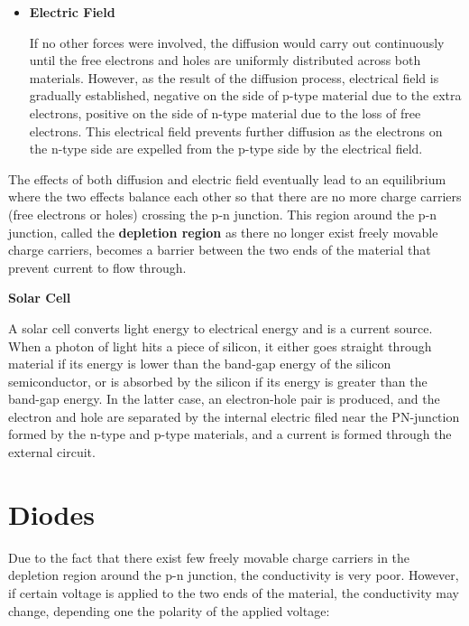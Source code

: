 \begin{itemize}
\begin{itemize}
\item {\bf Electric Field}

If no other forces were involved, the diffusion would carry out 
continuously until the free electrons and holes are uniformly distributed
across both materials. However, as the result of the diffusion process,
electrical field is gradually established, negative on the side of p-type 
material due to the extra electrons, positive on the side of n-type 
material due to the loss of free electrons. This electrical field prevents
further diffusion as the electrons on the n-type side are expelled from
the p-type side by the electrical field.

\end{itemize}

The effects of both diffusion and electric field eventually lead to an 
equilibrium where the two effects balance each other so that there are
no more charge carriers (free electrons or holes) crossing the p-n junction.
This region around the p-n junction, called the {\bf depletion region} as 
there no longer exist freely movable charge carriers, becomes a barrier 
between the two ends of the material that prevent current to flow through.


{\bf Solar Cell}

A solar cell converts light energy to electrical energy and is a current source.
When a photon of light hits a piece of silicon, it either goes straight through
material if its energy is lower than the band-gap energy of the silicon semiconductor,
or is absorbed by the silicon if its energy is greater than the band-gap energy.
In the latter case, an electron-hole pair is produced, and the electron and hole
are separated by the internal electric filed near the PN-junction formed by the 
n-type and p-type materials, and a current is formed through the external circuit.



\end{itemize}

\section*{Diodes}

Due to the fact that there exist few freely movable charge carriers in the
depletion region around the p-n junction, the conductivity is very poor.
However, if certain voltage is applied to the two ends of the material, 
the conductivity may change, depending one the polarity of the applied
voltage:

